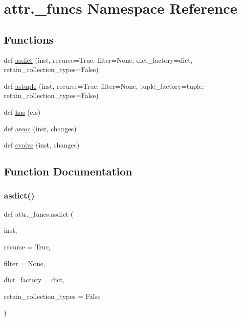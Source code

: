 \hypertarget{namespaceattr_1_1__funcs}{}\section{attr.\+\_\+funcs Namespace Reference}
\label{namespaceattr_1_1__funcs}
\subsection*{Functions}
\begin{DoxyCompactItemize}
\item 
def \hyperlink{namespaceattr_1_1__funcs_a323456eb598a510b152f620a690a5610}{asdict} (inst, recurse=True, filter=None, dict\+\_\+factory=dict, retain\+\_\+collection\+\_\+types=False)
\item 
def \hyperlink{namespaceattr_1_1__funcs_a6166d0c652fbc7bed26aafb6f92b0b76}{astuple} (inst, recurse=True, filter=None, tuple\+\_\+factory=tuple, retain\+\_\+collection\+\_\+types=False)
\item 
def \hyperlink{namespaceattr_1_1__funcs_adbd5a4d35a456dd0c65876b5d01bf1cd}{has} (cls)
\item 
def \hyperlink{namespaceattr_1_1__funcs_a269a7a69e7aa34b7b39169c7025cbd5a}{assoc} (inst, changes)
\item 
def \hyperlink{namespaceattr_1_1__funcs_ad12e058dede1261831b7d9ce3e0e17f5}{evolve} (inst, changes)
\end{DoxyCompactItemize}


\subsection{Function Documentation}
\mbox{\label{namespaceattr_1_1__funcs_a323456eb598a510b152f620a690a5610}} 
\subsubsection{\texorpdfstring{asdict()}{asdict()}}
{\footnotesize\ttfamily def attr.\+\_\+funcs.\+asdict (\begin{DoxyParamCaption}\item[{}]{inst,  }\item[{}]{recurse = {\ttfamily True},  }\item[{}]{filter = {\ttfamily None},  }\item[{}]{dict\+\_\+factory = {\ttfamily dict},  }\item[{}]{retain\+\_\+collection\+\_\+types = {\ttfamily False} }\end{DoxyParamCaption})}

